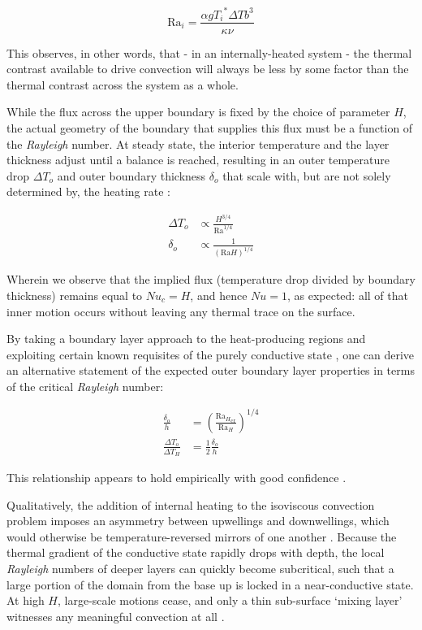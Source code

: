 \documentclass[a4paper,11pt,oneside]{book}
\begin{document}
\begin{equation}
{\mathrm{Ra}}_i = \frac{\alpha g {T_i}^{*} \Delta T b^3}{\kappa \nu}
\end{equation}

This observes, in other words, that - in an internally-heated system - the thermal contrast available to drive convection will always be less by some factor than the thermal contrast across the system as a whole.

While the flux across the upper boundary is fixed by the choice of parameter $H$, the actual geometry of the boundary that supplies this flux must be a function of the \textit{Rayleigh} number. At steady state, the interior temperature and the layer thickness adjust until a balance is reached, resulting in an outer temperature drop ${\Delta T}_o$ and outer boundary thickness ${\delta}_o$ that scale with, but are not solely determined by, the heating rate \cite{Schubert2001-ea}:

\begin{align*}
{\Delta T}_o &\propto \frac{H^{3/4}}{{\mathrm{Ra}}^{1/4}} \\
{\delta}_o &\propto \frac{1}{{(\mathrm{Ra}H)}^{1/4}}
\end{align*}

Wherein we observe that the implied flux (temperature drop divided by boundary thickness) remains equal to ${Nu}_c = H$, and hence $Nu=1$, as expected: all of that inner motion occurs without leaving any thermal trace on the surface.

By taking a boundary layer approach to the heat-producing regions \cite{Jaupart2010-zy} and exploiting certain known requisites of the purely conductive state \cite{Vilella2017-mg}, one can derive an alternative statement of the expected outer boundary layer properties in terms of the critical \textit{Rayleigh} number:

\begin{align*}
\frac{{\delta}_o}{h} &= {\left( \frac{{{\mathrm{Ra}}_{H}}_{\mathrm{cr}}}{{\mathrm{Ra}}_H} \right)}^{1/4} \\
\frac{{\Delta T}_o}{{\Delta T}_H} &= \frac{1}{2} \frac{{\delta}_o}{h}
\end{align*}

This relationship appears to hold empirically with good confidence \cite{Vilella2017-mg}.

Qualitatively, the addition of internal heating to the isoviscous convection problem imposes an asymmetry between upwellings and downwellings, which would otherwise be temperature-reversed mirrors of one another \cite{Weinstein1990-dd}. Because the thermal gradient of the conductive state rapidly drops with depth, the local \textit{Rayleigh} numbers of deeper layers can quickly become subcritical, such that a large portion of the domain from the base up is locked in a near-conductive state. At high $H$, large-scale motions cease, and only a thin sub-surface `mixing layer' witnesses any meaningful convection at all \cite{Parmentier1994-on}.
\end{document}
